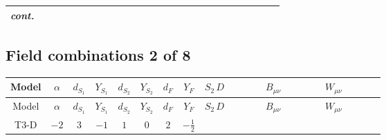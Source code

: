 \documentclass[8pt]{article}
\begin{document}
\begin{landscape}
\begin{longtable}{@{}cccccccc >{\raggedright\arraybackslash}p{0.21\linewidth} >{\raggedright\arraybackslash}p{0.21\linewidth} >{\raggedright\arraybackslash}p{0.21\linewidth}@{}}
\textit{cont.} &  &  &  &  &  &  &  & \scriptsize\adjustbox{max width=\linewidth}{$\begin{gathered} -\frac{2 \hbar  \overline{y_{1,i_1,r_1}} S_{1,j_3} S_{1,j_4} y_{1,i_1,r_1} S_{1,j_1}{}^{\dagger } S_{1,j_2}{}^{\dagger } \mathcal{I}_{S_1,j_1,j_3,j_2,j_4}{}^2 \lambda_{S_1}^{(1)}^{(2)}}{\sqrt{3} \epsilon } \\ -\frac{\hbar  \overline{y_{1,i_1,r_1}} S_{1,j_3} S_{1,j_4} y_{1,i_1,r_1} S_{1,j_1}{}^{\dagger } S_{1,j_2}{}^{\dagger } \mathcal{I}_{S_1,j_1,j_3,j_2,j_4}{}^2 \lambda_{S_1}^{(1)}^{(2)}}{\sqrt{3}}\end{gathered}$} &  &  \\
\midrule
\bottomrule
\end{longtable}
\clearpage
\subsection*{Field combinations 2 of 8}
\begin{longtable}{@{}cccccccc >{\raggedright\arraybackslash}p{0.21\linewidth} >{\raggedright\arraybackslash}p{0.21\linewidth} >{\raggedright\arraybackslash}p{0.21\linewidth}@{}}
\toprule
Model & $\alpha$ & $d_{S_1}$ & $Y_{S_1}$ & $d_{S_2}$ & $Y_{S_2}$ & $d_F$ & $Y_F$ & $S_2\,D$ & $B_{\mu\nu}$ & $W_{\mu\nu}$ \\
\midrule
\endfirsthead
\toprule
Model & $\alpha$ & $d_{S_1}$ & $Y_{S_1}$ & $d_{S_2}$ & $Y_{S_2}$ & $d_F$ & $Y_F$ & $S_2\,D$ & $B_{\mu\nu}$ & $W_{\mu\nu}$ \\
\midrule
\endhead
T3-D & $-2$ & $3$ & $-1$ & $1$ & $0$ & $2$ & $-\frac{1}{2}$ & \scriptsize\adjustbox{max width=\linewidth}{$\begin{gathered} +D_{\mu _1}\left(S_2\right){}^{\dagger } D_{\mu _1}\left(S_2\right)\end{gathered}$} & \scriptsize\adjustbox{max width=\linewidth}{$\begin{gathered} -\frac{\hbar  B_{\mu _1\mu _2}^2}{2 \epsilon }\end{gathered}$} & \scriptsize\adjustbox{max width=\linewidth}{$\begin{gathered} -\frac{\hbar  \left(W_{\mu _1\mu _2}^{A_1}\right){}^2}{2 \epsilon }\end{gathered}$} \\
\midrule
\bottomrule
\end{longtable}
\clearpage

\end{landscape}
\end{document}
